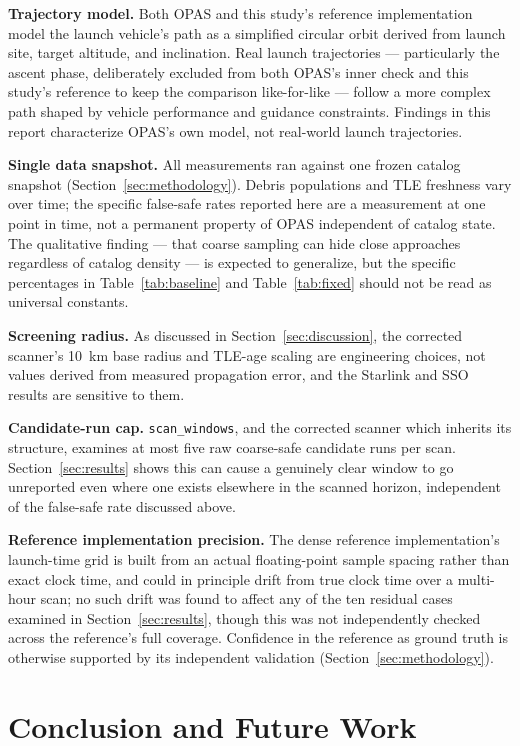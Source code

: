 \documentclass[11pt,a4paper]{article}
\begin{document}
\textbf{Trajectory model.} Both OPAS and this study's reference
implementation model the launch vehicle's path as a simplified circular
orbit derived from launch site, target altitude, and inclination. Real
launch trajectories --- particularly the ascent phase, deliberately
excluded from both OPAS's inner check and this study's reference to keep
the comparison like-for-like --- follow a more complex path shaped by
vehicle performance and guidance constraints. Findings in this report
characterize OPAS's own model, not real-world launch trajectories.

\textbf{Single data snapshot.} All measurements ran against one frozen
catalog snapshot (Section~\ref{sec:methodology}). Debris populations and TLE
freshness vary over time; the specific false-safe rates reported here are a
measurement at one point in time, not a permanent property of OPAS
independent of catalog state. The qualitative finding --- that coarse
sampling can hide close approaches regardless of catalog density --- is
expected to generalize, but the specific percentages in
Table~\ref{tab:baseline} and Table~\ref{tab:fixed} should not be read as
universal constants.

\textbf{Screening radius.} As discussed in Section~\ref{sec:discussion}, the
corrected scanner's 10~km base radius and TLE-age scaling are engineering
choices, not values derived from measured propagation error, and the
Starlink and SSO results are sensitive to them.

\textbf{Candidate-run cap.} \texttt{scan\_windows}, and the corrected
scanner which inherits its structure, examines at most five raw
coarse-safe candidate runs per scan. Section~\ref{sec:results} shows this
can cause a genuinely clear window to go unreported even where one exists
elsewhere in the scanned horizon, independent of the false-safe rate
discussed above.

\textbf{Reference implementation precision.} The dense reference
implementation's launch-time grid is built from an actual floating-point
sample spacing rather than exact clock time, and could in principle drift
from true clock time over a multi-hour scan; no such drift was found to
affect any of the ten residual cases examined in Section~\ref{sec:results},
though this was not independently checked across the reference's full
coverage. Confidence in the reference as ground truth is otherwise
supported by its independent validation (Section~\ref{sec:methodology}).

\section{Conclusion and Future Work}
\label{sec:conclusion}
\end{document}
